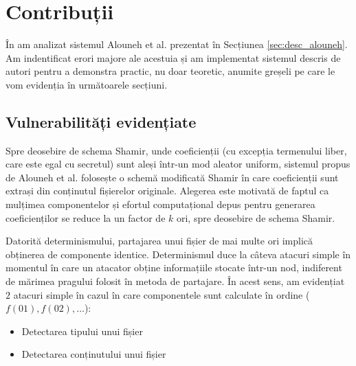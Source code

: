 \documentclass[oneside, 12pt]{book}
\begin{document}

\section{Contribuții}
\label{sec:alouneh_contributions}

În \cite{RD:2015} am analizat sistemul Alouneh et al. prezentat în Secțiunea \ref{sec:desc_alouneh}. Am indentificat erori majore ale acestuia și am implementat sistemul descris de autori pentru a demonstra practic, nu doar teoretic, anumite greșeli pe care le vom evidenția în următoarele secțiuni.

\subsection{Vulnerabilități evidențiate}

Spre deosebire de schema Shamir, unde coeficienții (cu excepția termenului liber, care este egal cu secretul) sunt aleși într-un mod aleator uniform, sistemul propus de Alouneh et al. folosește o schemă modificată Shamir în care coeficienții sunt extrași din conținutul fișierelor originale.
Alegerea este motivată de faptul ca mulțimea componentelor și efortul computațional depus pentru generarea coeficienților se reduce la un factor de $k$ ori, spre deosebire de schema Shamir.

Datorită determinismului, partajarea unui fișier de mai multe ori implică obținerea de componente identice.
Determinismul duce la câteva atacuri simple în momentul în care un atacator obține informațiile stocate într-un nod, indiferent de mărimea pragului folosit în metoda de partajare. În acest sens, am evidențiat $2$ atacuri simple în cazul în care componentele sunt calculate în ordine ($f(01), f(02), \dots$):
\begin{itemize}
	\item Detectarea tipului unui fișier
	\item Detectarea conținutului unui fișier
\end{itemize}
\end{document}
